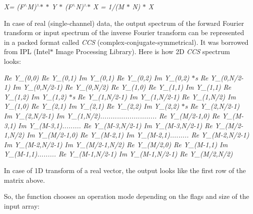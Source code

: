 {\itshape X\textquotesingle{}= (F$^\wedge$M)$^\wedge$$\ast$ $\ast$ Y $\ast$ (F$^\wedge$N)$^\wedge$$\ast$ X = 1/(M $\ast$ N) $\ast$ X\textquotesingle{} }

In case of real (single-\/channel) data, the output spectrum of the forward Fourier transform or input spectrum of the inverse Fourier transform can be represented in a packed format called {\itshape C\+CS} (complex-\/conjugate-\/symmetrical). It was borrowed from I\+PL (Intel$\ast$ Image Processing Library). Here is how 2D {\itshape C\+CS} spectrum looks\+:

{\itshape Re Y\+\_\+(0,0) Re Y\+\_\+(0,1) Im Y\+\_\+(0,1) Re Y\+\_\+(0,2) Im Y\+\_\+(0,2) $\ast$s Re Y\+\_\+(0,N/2-\/1) Im Y\+\_\+(0,N/2-\/1) Re Y\+\_\+(0,N/2) Re Y\+\_\+(1,0) Re Y\+\_\+(1,1) Im Y\+\_\+(1,1) Re Y\+\_\+(1,2) Im Y\+\_\+(1,2) $\ast$s Re Y\+\_\+(1,N/2-\/1) Im Y\+\_\+(1,N/2-\/1) Re Y\+\_\+(1,N/2) Im Y\+\_\+(1,0) Re Y\+\_\+(2,1) Im Y\+\_\+(2,1) Re Y\+\_\+(2,2) Im Y\+\_\+(2,2) $\ast$s Re Y\+\_\+(2,N/2-\/1) Im Y\+\_\+(2,N/2-\/1) Im Y\+\_\+(1,N/2)........................... Re Y\+\_\+(M/2-\/1,0) Re Y\+\_\+(M-\/3,1) Im Y\+\_\+(M-\/3,1)......... Re Y\+\_\+(M-\/3,N/2-\/1) Im Y\+\_\+(M-\/3,N/2-\/1) Re Y\+\_\+(M/2-\/1,N/2) Im Y\+\_\+(M/2-\/1,0) Re Y\+\_\+(M-\/2,1) Im Y\+\_\+(M-\/2,1)......... Re Y\+\_\+(M-\/2,N/2-\/1) Im Y\+\_\+(M-\/2,N/2-\/1) Im Y\+\_\+(M/2-\/1,N/2) Re Y\+\_\+(M/2,0) Re Y\+\_\+(M-\/1,1) Im Y\+\_\+(M-\/1,1)......... Re Y\+\_\+(M-\/1,N/2-\/1) Im Y\+\_\+(M-\/1,N/2-\/1) Re Y\+\_\+(M/2,N/2) }

In case of 1D transform of a real vector, the output looks like the first row of the matrix above.

So, the function chooses an operation mode depending on the flags and size of the input array\+:



